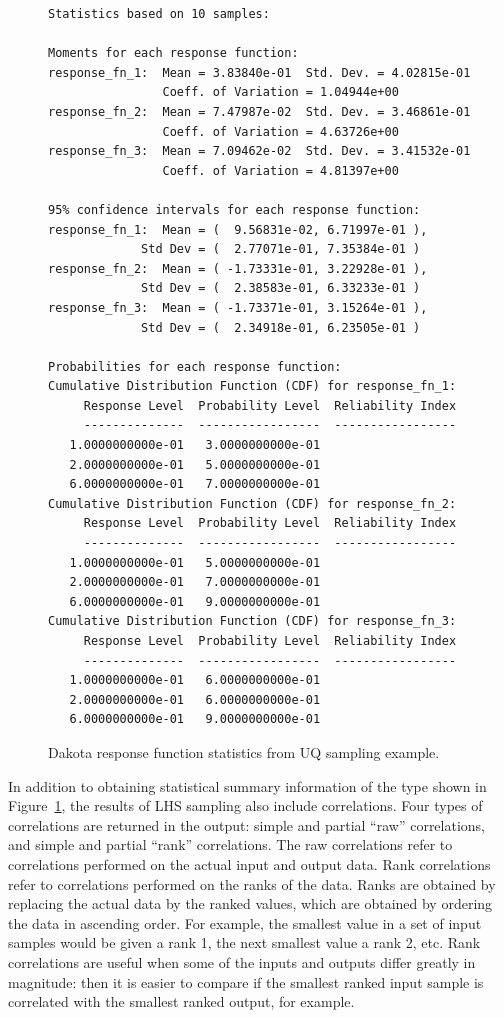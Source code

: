 \begin{figure}
\centering
\begin{bigbox}
\begin{small}
\begin{verbatim}
Statistics based on 10 samples:

Moments for each response function:
response_fn_1:  Mean = 3.83840e-01  Std. Dev. = 4.02815e-01
                Coeff. of Variation = 1.04944e+00
response_fn_2:  Mean = 7.47987e-02  Std. Dev. = 3.46861e-01
                Coeff. of Variation = 4.63726e+00
response_fn_3:  Mean = 7.09462e-02  Std. Dev. = 3.41532e-01
                Coeff. of Variation = 4.81397e+00

95% confidence intervals for each response function:
response_fn_1:  Mean = (  9.56831e-02, 6.71997e-01 ),
             Std Dev = (  2.77071e-01, 7.35384e-01 )
response_fn_2:  Mean = ( -1.73331e-01, 3.22928e-01 ),
             Std Dev = (  2.38583e-01, 6.33233e-01 )
response_fn_3:  Mean = ( -1.73371e-01, 3.15264e-01 ),
             Std Dev = (  2.34918e-01, 6.23505e-01 )

Probabilities for each response function:
Cumulative Distribution Function (CDF) for response_fn_1:
     Response Level  Probability Level  Reliability Index
     --------------  -----------------  -----------------
   1.0000000000e-01   3.0000000000e-01
   2.0000000000e-01   5.0000000000e-01
   6.0000000000e-01   7.0000000000e-01
Cumulative Distribution Function (CDF) for response_fn_2:
     Response Level  Probability Level  Reliability Index
     --------------  -----------------  -----------------
   1.0000000000e-01   5.0000000000e-01
   2.0000000000e-01   7.0000000000e-01
   6.0000000000e-01   9.0000000000e-01
Cumulative Distribution Function (CDF) for response_fn_3:
     Response Level  Probability Level  Reliability Index
     --------------  -----------------  -----------------
   1.0000000000e-01   6.0000000000e-01
   2.0000000000e-01   6.0000000000e-01
   6.0000000000e-01   9.0000000000e-01
\end{verbatim}
\end{small}
\end{bigbox}
\caption{Dakota response function statistics from UQ sampling example.}
\label{uq:figure03}
\end{figure}

In addition to obtaining statistical summary information of the type
shown in Figure~\ref{uq:figure03}, the results of LHS sampling also
include correlations. Four types of correlations are returned in the
output: simple and partial ``raw'' correlations, and simple and
partial ``rank'' correlations. The raw correlations refer to
correlations performed on the actual input and output data. Rank
correlations refer to correlations performed on the ranks of the data.
Ranks are obtained by replacing the actual data by the ranked values,
which are obtained by ordering the data in ascending order. For
example, the smallest value in a set of input samples would be given a
rank 1, the next smallest value a rank 2, etc. Rank correlations are
useful when some of the inputs and outputs differ greatly in
magnitude: then it is easier to compare if the smallest ranked input
sample is correlated with the smallest ranked output, for example.

